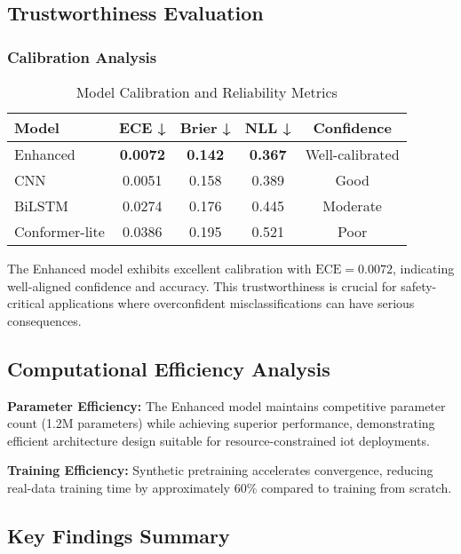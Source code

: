 \documentclass[journal]{IEEEtran}
\begin{document}
\subsection{Trustworthiness Evaluation}

\subsubsection{Calibration Analysis}

\begin{table}[ht]
\centering
\caption{Model Calibration and Reliability Metrics}
\begin{tabular}{@{}lcccc@{}}
\toprule
Model & ECE ↓ & Brier ↓ & NLL ↓ & Confidence \\
\midrule
Enhanced & \textbf{0.0072} & \textbf{0.142} & \textbf{0.367} & Well-calibrated \\
CNN & 0.0051 & 0.158 & 0.389 & Good \\
BiLSTM & 0.0274 & 0.176 & 0.445 & Moderate \\
Conformer-lite & 0.0386 & 0.195 & 0.521 & Poor \\
\bottomrule
\end{tabular}
\label{tab:calibration}
\end{table}

The Enhanced model exhibits excellent calibration with $\text{ECE}=0.0072$, indicating well-aligned confidence and accuracy. This trustworthiness is crucial for safety-critical applications where overconfident misclassifications can have serious consequences.

\subsection{Computational Efficiency Analysis}

\textbf{Parameter Efficiency:} The Enhanced model maintains competitive parameter count (1.2M parameters) while achieving superior performance, demonstrating efficient architecture design suitable for resource-constrained \gls{iot} deployments.

\textbf{Training Efficiency:} Synthetic pretraining accelerates convergence, reducing real-data training time by approximately 60\% compared to training from scratch.

\subsection{Key Findings Summary}
\end{document}
